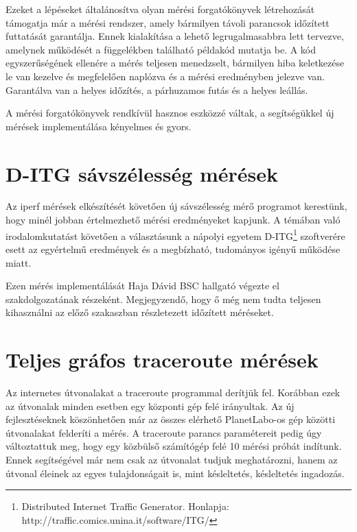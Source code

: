 Ezeket a lépéseket általánosítva olyan mérési forgatókönyvek létrehozását támogatja már a mérési rendszer, amely bármilyen távoli parancsok időzített futtatását garantálja. Ennek kialakítása a lehető legrugalmasabbra lett tervezve, amelynek működését a függelékben található példakód mutatja be. A kód egyszerűségének ellenére a mérés teljesen menedzselt, bármilyen hiba keletkezése le van kezelve és megfelelően naplózva és a mérési eredményben jelezve van. Garantálva van a helyes időzítés, a párhuzamos futás és a helyes leállás.

A mérési forgatókönyvek rendkívül hasznos eszközzé váltak, a segítségükkel új mérések implementálása kényelmes és gyors.



\section{D-ITG sávszélesség mérések}
Az iperf mérések elkészítését követően új sávszélesség mérő programot kerestünk, hogy minél jobban értelmezhető mérési eredményeket kapjunk. A témában való irodalomkutatást követően a választásunk a nápolyi egyetem D-ITG\footnote{Distributed Internet Traffic Generator. Honlapja: http://traffic.comics.unina.it/software/ITG/} szoftverére esett az egyértelmű eredmények és a megbízható, tudományos igényű működése miatt.

Ezen mérés implementálását Haja Dávid BSC hallgató végezte el szakdolgozatának részeként. Megjegyzendő, hogy ő még nem tudta teljesen kihasználni az előző szakaszban részletezett időzített méréseket.


\pagebreak

\section{Teljes gráfos traceroute mérések}
Az internetes útvonalakat a traceroute programmal derítjük fel. Korábban ezek az útvonalak minden esetben egy központi gép felé irányultak. Az új fejlesztéseknek köszönhetően már az összes elérhető PlanetLabo-os gép közötti útvonalakat felderíti a mérés. A traceroute parancs paramétereit pedig úgy változtattuk meg, hogy egy közbülső számítógép felé 10 mérési próbát indítunk. Ennek segítségével már nem csak az útvonalat tudjuk meghatározni, hanem az útvonal éleinek az egyes tulajdonságait is, mint késleltetés, késleltetés ingadozás.

